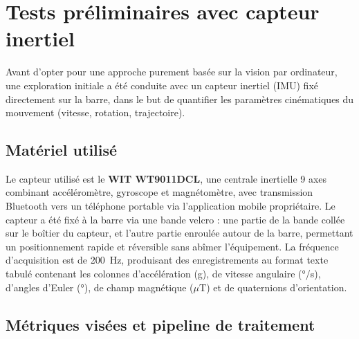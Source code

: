 
\appendix

\chapter{Tests préliminaires avec capteur inertiel} \label{ann:imu-tests}

Avant d'opter pour une approche purement basée sur la vision par ordinateur, une exploration initiale a été conduite avec un capteur inertiel (IMU) fixé directement sur la barre, dans le but de quantifier les paramètres cinématiques du mouvement (vitesse, rotation, trajectoire).

\section*{Matériel utilisé}

Le capteur utilisé est le \textbf{WIT WT9011DCL}, une centrale inertielle 9 axes combinant accéléromètre, gyroscope et magnétomètre, avec transmission Bluetooth vers un téléphone portable via l'application mobile propriétaire. Le capteur a été fixé à la barre via une bande velcro : une partie de la bande collée sur le boîtier du capteur, et l'autre partie enroulée autour de la barre, permettant un positionnement rapide et réversible sans abîmer l'équipement. La fréquence d'acquisition est de 200~Hz, produisant des enregistrements au format texte tabulé contenant les colonnes d'accélération (g), de vitesse angulaire (°/s), d'angles d'Euler (°), de champ magnétique ($\mu$T) et de quaternions d'orientation.

\section*{Métriques visées et pipeline de traitement}

